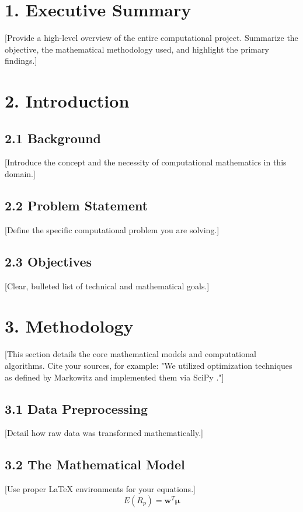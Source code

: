 \documentclass[12pt, a4paper]{report}
\begin{document}
\chapter*{1. Executive Summary}
[Provide a high-level overview of the entire computational project. Summarize the objective, the mathematical methodology used, and highlight the primary findings.]

\chapter*{2. Introduction}
\section*{2.1 Background}
[Introduce the concept and the necessity of computational mathematics in this domain.]

\section*{2.2 Problem Statement}
[Define the specific computational problem you are solving.]

\section*{2.3 Objectives}
[Clear, bulleted list of technical and mathematical goals.]

\chapter*{3. Methodology}
[This section details the core mathematical models and computational algorithms. Cite your sources, for example: "We utilized optimization techniques as defined by Markowitz \cite{markowitz} and implemented them via SciPy \cite{scipy}."]

\section*{3.1 Data Preprocessing}
[Detail how raw data was transformed mathematically.]

\section*{3.2 The Mathematical Model}
[Use proper LaTeX environments for your equations.]
\begin{equation}
    E(R_p) = \mathbf{w}^T \boldsymbol{\mu}
\end{equation}
\end{document}

